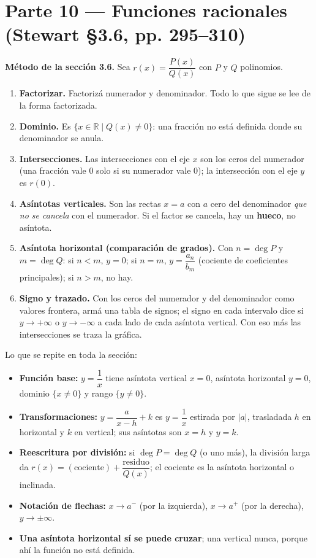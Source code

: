 \documentclass[11pt]{article}
\begin{document}
\shorthandoff{<>}  %

\section*{Parte 10 — Funciones racionales (Stewart §3.6, pp. 295--310)}

\begin{teo}
\textbf{Método de la sección 3.6.} Sea $r(x)=\dfrac{P(x)}{Q(x)}$ con $P$ y $Q$ polinomios.
\begin{enumerate}[leftmargin=*]
\item \textbf{Factorizar.} Factorizá numerador y denominador. Todo lo que sigue se lee de la forma factorizada.
\item \textbf{Dominio.} Es $\{x\in\mathbb{R}\mid Q(x)\ne 0\}$: una fracción no está definida donde su denominador se anula.
\item \textbf{Intersecciones.} Las intersecciones con el eje $x$ son los ceros del numerador (una fracción vale $0$ solo si su numerador vale $0$); la intersección con el eje $y$ es $r(0)$.
\item \textbf{Asíntotas verticales.} Son las rectas $x=a$ con $a$ cero del denominador \emph{que no se cancela} con el numerador. Si el factor se cancela, hay un \textbf{hueco}, no asíntota.
\item \textbf{Asíntota horizontal (comparación de grados).} Con $n=\deg P$ y $m=\deg Q$: si $n<m$, $y=0$; si $n=m$, $y=\dfrac{a_n}{b_m}$ (cociente de coeficientes principales); si $n>m$, no hay.
\item \textbf{Signo y trazado.} Con los ceros del numerador y del denominador como valores frontera, armá una tabla de signos; el signo en cada intervalo dice si $y\to+\infty$ o $y\to-\infty$ a cada lado de cada asíntota vertical. Con eso más las intersecciones se traza la gráfica.
\end{enumerate}
\end{teo}

\begin{tip}
Lo que se repite en toda la sección:
\begin{itemize}[leftmargin=*]
\item \textbf{Función base:} $y=\dfrac{1}{x}$ tiene asíntota vertical $x=0$, asíntota horizontal $y=0$, dominio $\{x\ne 0\}$ y rango $\{y\ne 0\}$.
\item \textbf{Transformaciones:} $y=\dfrac{a}{x-h}+k$ es $y=\dfrac1x$ estirada por $|a|$, trasladada $h$ en horizontal y $k$ en vertical; sus asíntotas son $x=h$ y $y=k$.
\item \textbf{Reescritura por división:} si $\deg P=\deg Q$ (o uno más), la división larga da $r(x)=(\text{cociente})+\dfrac{\text{residuo}}{Q(x)}$; el cociente es la asíntota horizontal o inclinada.
\item \textbf{Notación de flechas:} $x\to a^-$ (por la izquierda), $x\to a^+$ (por la derecha), $y\to\pm\infty$.
\item \textbf{Una asíntota horizontal sí se puede cruzar}; una vertical nunca, porque ahí la función no está definida.
\end{itemize}
\end{tip}
\end{document}
